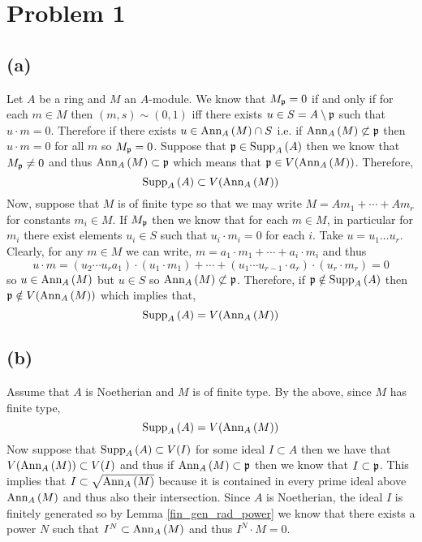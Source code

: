 \documentclass[12pt]{extarticle}
\begin{document}
 
\section{Problem 1}

\subsection*{(a)}
Let $A$ be a ring and $M$ an $A$-module. We know that $M_{\p} = 0$ if and only if for each $m \in M$ then $(m, s) \sim (0, 1)$ iff there exists $u \in S = A \setminus \p$ such that $u \cdot m = 0$. Therefore if there exists $u \in \Ann{A}{M} \cap S$ i.e. if $\Ann{A}{M} \not\subset \p$ then $u \cdot m = 0$ for all $m$ so $M_{\p} = 0$. Suppose that $\p \in \Supp{A}{M}$ then we know that $M_{\p} \neq 0$ and thus $\Ann{A}{M} \subset \p$ which means that $\p \in V(\Ann{A}{M})$. Therefore,
\[ \Supp{A}{M} \subset V(\Ann{A}{M}) \]
Now, suppose that $M$ is of finite type so that we may write $M = A m_1 + \cdots + A m_r$ for constants $m_i \in M$. If $M_{\p}$ then we know that for each $m \in M$, in particular for $m_i$ there exist elements $u_i \in S$ such that $u_i \cdot m_i = 0$ for each $i$. Take $u = u_1 \dots u_r$. Clearly, for any $m \in M$ we can write,
$m = a_1 \cdot m_1 + \cdots + a_i \cdot m_i$ and thus
\[ u \cdot m = (u_2 \cdots u_r a_1) \cdot (u_1 \cdot m_1) + \cdots + (u_1 \cdots u_{r-1} \cdot a_r) \cdot (u_r \cdot m_r) = 0 \]
so $u \in \Ann{A}{M}$ but $u \in S$ so $\Ann{A}{M} \not\subset \p$. Therefore, if $\p \notin \Supp{A}{M}$ then $\p \notin V(\Ann{A}{M})$ which implies that,
\[ \Supp{A}{M} = V(\Ann{A}{M}) \]

\subsection*{(b)}
Assume that $A$ is Noetherian and $M$ is of finite type. By the above, since $M$ has finite type,
\[ \Supp{A}{M} = V(\Ann{A}{M}) \]
Now suppose that $\Supp{A}{M} \subset V(I)$ for some ideal $I \subset A$ then we have that $V(\Ann{A}{M}) \subset V(I)$ and thus if $\Ann{A}{M} \subset \p$ then we know that $I \subset \p$. This implies that $I \subset \sqrt{\Ann{A}{M}}$ because it is contained in every prime ideal above $\Ann{A}{M}$ and thus also their intersection. Since $A$ is Noetherian, the ideal $I$ is finitely generated so by Lemma \ref{fin_gen_rad_power} we know that there exists a power $N$ such that $I^N \subset \Ann{A}{M}$ and thus $I^N \cdot M = 0$. 
\end{document}
